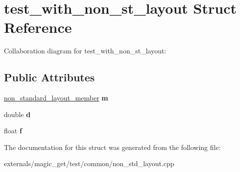 \hypertarget{structtest__with__non__st__layout}{}\section{test\+\_\+with\+\_\+non\+\_\+st\+\_\+layout Struct Reference}
\label{structtest__with__non__st__layout}


Collaboration diagram for test\+\_\+with\+\_\+non\+\_\+st\+\_\+layout\+:
\subsection*{Public Attributes}
\begin{DoxyCompactItemize}
\item 
\mbox{\label{structtest__with__non__st__layout_a0f272c197c092e890c192ff36efc3ee4}} 
\mbox{\hyperlink{structnon__standard__layout__member}{non\+\_\+standard\+\_\+layout\+\_\+member}} {\bfseries m}
\item 
\mbox{\label{structtest__with__non__st__layout_a3612ff6c7be7f6e7b4dfdf6d22e48dfa}} 
double {\bfseries d}
\item 
\mbox{\label{structtest__with__non__st__layout_a9a02156339f876490bf8b75cca635dc4}} 
float {\bfseries f}
\end{DoxyCompactItemize}


The documentation for this struct was generated from the following file\+:\begin{DoxyCompactItemize}
\item 
externals/magic\+\_\+get/test/common/non\+\_\+std\+\_\+layout.\+cpp\end{DoxyCompactItemize}
